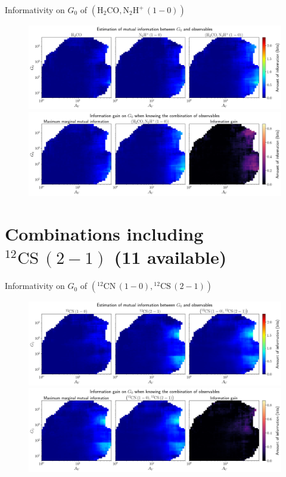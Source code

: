 \documentclass{beamer}
\begin{document}
\begin{frame}{Informativity on $G_0$ of $\left(\mathrm{H_2CO},\mathrm{N_2H^+\,(1-0)}\right)$}
    \begin{figure}
        \centering
        \includegraphics[width=0.95\linewidth]{../mi/g0__h2co_n2hp10_mi.png}
        \vfill
        \includegraphics[width=0.95\linewidth]{../mi/g0__h2co_n2hp10_mi_gain.png}
    \end{figure}
\end{frame}

\section{Combinations including $\mathrm{^{12}CS\,(2-1)}$ (11 available)}

\begin{frame}{Informativity on $G_0$ of $\left(\mathrm{^{12}CN\,(1-0)},\mathrm{^{12}CS\,(2-1)}\right)$}
    \begin{figure}
        \centering
        \includegraphics[width=0.95\linewidth]{../mi/g0__12cn10_12cs21_mi.png}
        \vfill
        \includegraphics[width=0.95\linewidth]{../mi/g0__12cn10_12cs21_mi_gain.png}
    \end{figure}
\end{frame}
\end{document}
